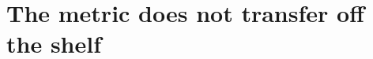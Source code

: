 \section{The metric does not transfer off the shelf}
\label{sec:reference}
%


\begin{table}[t]
  \centering
  \caption{Running \texttt{segmentation-skeleton-metrics}  on
  DRIVE. Their loop measures only the component containing each label's
  first node; the rest of the covered skeleton is silently dropped.
  }
  \label{tab:reference}
  
\end{table}
